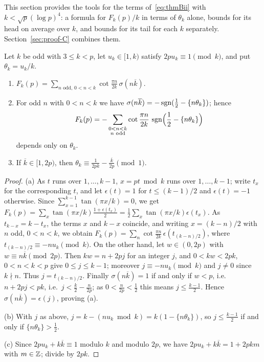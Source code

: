 This section provides the tools for the terms of~\eqref{eq:thmBii} with $k<\sqrt p(\log p)^4$: a formula for
$F_k(p)/k$ in terms of $\theta_k$ alone, bounds for its head on average over $k$, and bounds for its tail for each $k$
separately. Section~\ref{sec:proof-C} combines them.

\begin{lemma}\label{lem:sign-form-tangent}
Let $k$ be odd with $3\le k<p$, let $u_k\in[1,k)$ satisfy $2pu_k\equiv1\pmod k$, and put $\theta_k=u_k/k$.
\begin{enumerate}[label=\textup{(\alph*)},leftmargin=*]
\item $F_k(p)=\sum_{n\text{ odd},\,0<n<k}\cot\frac{\pi n}{2k}\,\sigma(n\overline{k})$.
\item For odd $n$ with $0<n<k$ we have $\sigma(n\overline{k})=-\operatorname{sgn}(\frac12-\{n\theta_k\})$; hence
\[
F_k(p)=-\sum_{\substack{0<n<k\\ n\text{ odd}}}\cot\frac{\pi n}{2k}\,\operatorname{sgn}\Bigl(\frac12-\{n\theta_k\}\Bigr)
\]
depends only on $\theta_k$.
\item If $\overline{k}\in[1,2p)$, then $\theta_k\equiv\frac1{2pk}-\frac{\overline{k}}{2p}\pmod 1$.
\end{enumerate}
\end{lemma}

\begin{proof}
(a) As $t$ runs over $1,\dots,k-1$, $x=pt\bmod k$ runs over $1,\dots,k-1$; write $t_x$ for the corresponding $t$, and
let $\epsilon(t)=1$ for $t\le(k-1)/2$ and $\epsilon(t)=-1$ otherwise. Since $\sum_{x=1}^{k-1}\tan(\pi x/k)=0$, we get
$F_k(p)=\sum_x\tan(\pi x/k)\frac{1+\epsilon(t_x)}{2}=\frac12\sum_x\tan(\pi x/k)\epsilon(t_x)$. As $t_{k-x}=k-t_x$, the
terms $x$ and $k-x$ coincide, and writing $x=(k-n)/2$ with $n$ odd, $0<n<k$, we obtain
$F_k(p)=\sum_n\cot\frac{\pi n}{2k}\,\epsilon(t_{(k-n)/2})$, where $t_{(k-n)/2}\equiv-nu_k\pmod k$. On the other hand,
let $w\in(0,2p)$ with $w\equiv n\overline{k}\pmod{2p}$. Then $kw=n+2pj$ for an integer $j$, and $0<kw<2pk$,
$0<n<k<p$ give $0\le j\le k-1$; moreover $j\equiv-nu_k\pmod k$ and $j\ne0$ since $k\nmid n$. Thus $j=t_{(k-n)/2}$.
Finally $\sigma(n\overline{k})=1$ if and only if $w<p$, i.e.\ $n+2pj<pk$, i.e.\ $j<\frac k2-\frac n{2p}$; as
$0<\frac n{2p}<\frac12$ this means $j\le\frac{k-1}2$. Hence $\sigma(n\overline{k})=\epsilon(j)$, proving (a).

(b) With $j$ as above, $j=k-(nu_k\bmod k)=k(1-\{n\theta_k\})$, so $j\le\frac{k-1}2$ if and only if
$\{n\theta_k\}>\frac12$.

(c) Since $2pu_k+k\overline{k}\equiv1$ modulo $k$ and modulo $2p$, we have $2pu_k+k\overline{k}=1+2pkm$ with
$m\in\mathbb{Z}$; divide by $2pk$.
\end{proof}

